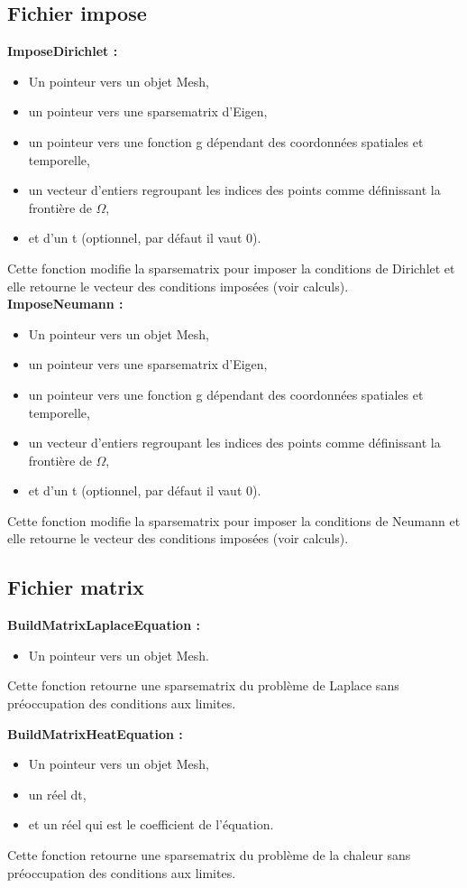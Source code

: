 \documentclass[french]{article}
\newcommand{\elodie}{\hfill{\color{red}{Élodie}}}
\newcommand{\valentin}{\hfill{\color{blue}{Valentin}}}
\newcommand{\alexis}{\hfill{\color{green}{Alexis}}}
\begin{document}
\subsection{Fichier impose}
\textbf{ImposeDirichlet :}\alexis
\begin{itemize}
\item Un pointeur vers un objet Mesh,
\item un pointeur vers une sparsematrix d'Eigen,
\item un pointeur vers une fonction g dépendant des coordonnées spatiales et temporelle,
\item un vecteur d'entiers regroupant les indices des points comme définissant la frontière de $\Omega$,
\item et d'un t (optionnel, par défaut il vaut 0).
\end{itemize}
Cette fonction modifie la sparsematrix pour imposer la conditions de Dirichlet et elle retourne le vecteur des conditions imposées (voir calculs).\\

\textbf{ImposeNeumann :}\valentin
\begin{itemize}
\item Un pointeur vers un objet Mesh,
\item un pointeur vers une sparsematrix d'Eigen,
\item un pointeur vers une fonction g dépendant des coordonnées spatiales et temporelle,
\item un vecteur d'entiers regroupant les indices des points comme définissant la frontière de $\Omega$,
\item et d'un t (optionnel, par défaut il vaut 0).
\end{itemize}
Cette fonction modifie la sparsematrix pour imposer la conditions de Neumann et elle retourne le vecteur des conditions imposées (voir calculs).

\subsection{Fichier matrix}

\textbf{BuildMatrixLaplaceEquation :}\elodie
\begin{itemize}
\item Un pointeur vers un objet Mesh.
\end{itemize}
Cette fonction retourne une sparsematrix du problème de Laplace sans préoccupation des conditions aux limites.

\textbf{BuildMatrixHeatEquation :}\alexis
\begin{itemize}
\item Un pointeur vers un objet Mesh,
\item un réel dt,
\item et un réel qui est le coefficient de l'équation.
\end{itemize}
Cette fonction retourne une sparsematrix du problème de la chaleur sans préoccupation des conditions aux limites.
\end{document}
